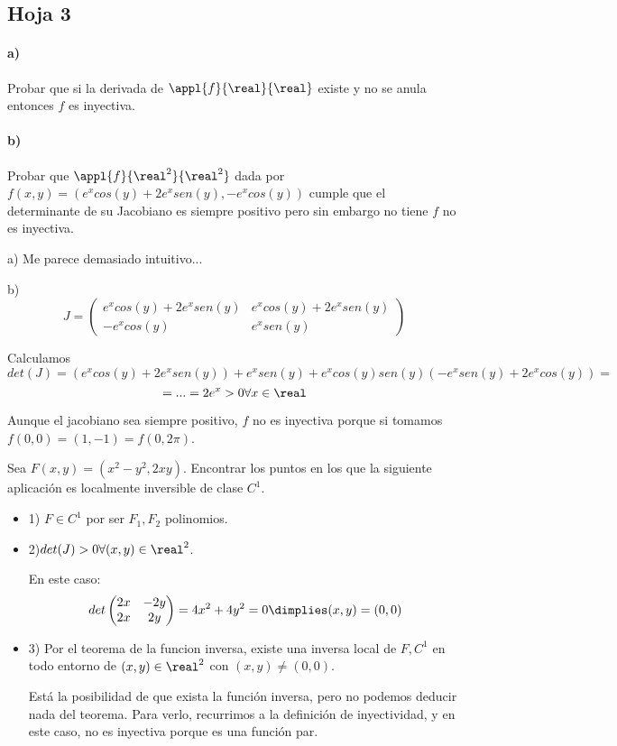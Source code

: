 \subsection{Hoja 3}
\begin{problem}[3]
\paragraph{a)} Probar que si la derivada de $\appl{f}{\real}{\real}$ existe y no se anula entonces $f$ es inyectiva.
\paragraph{b)} Probar que $\appl{f}{\real^2}{\real^2}$ dada por $f(x,y) =( e^xcos(y) + 2e^xsen(y),-e^xcos(y))$ cumple que el determinante de su Jacobiano es siempre positivo pero sin embargo no tiene $f$ no es inyectiva.

\solution

a)
Me parece demasiado intuitivo...

b)
$$J = \begin{pmatrix}
       e^xcos(y)+2e^xsen(y) & e^xcos(y)+2e^xsen(y) \\
       -e^xcos(y) & e^xsen(y)
      \end{pmatrix}
$$

Calculamos $$det(J) = (e^xcos(y)+2e^xsen(y))+e^xsen(y) + e^xcos(y)sen(y)(-e^xsen(y)+2e^xcos(y)) = $$
$$ = ... = 2e^x > 0 \forall x \in \real$$

Aunque el jacobiano sea siempre positivo, $f$ no es inyectiva porque si tomamos $f(0,0) = (1,-1) = f(0,2\pi)$.
\end{problem}
\begin{problem}[inventado]
\label{inventado}
Sea $F(x,y) = (x^2-y^2,2xy)$. Encontrar los puntos en los que la siguiente aplicación es localmente inversible de clase $C^1$.
\solution
\begin{itemize}
 \item 1) $F \in C^1$ por ser $F_1,F_2$ polinomios.
 \item 2)$det(J)>0 \forall (x,y)\in \real^2$. 
 
 En este caso: $$det\begin{pmatrix}
                  2x&-2y\\
                  2x&2y
                 \end{pmatrix} = 4x^2 + 4y^2 = 0 \dimplies (x,y) = (0,0)$$           
 \item 3) Por el teorema de la funcion inversa, existe una inversa local de $F,C^1$ en todo entorno de $(x,y) \in \real^2$ con $(x,y)\neq (0,0)$. 
 
 Está la posibilidad de que exista la función inversa, pero no podemos deducir nada del teorema. Para verlo, recurrimos a la definición de inyectividad, y en este caso, no es inyectiva porque es una función par.
 \end{itemize}
 \end{problem}
